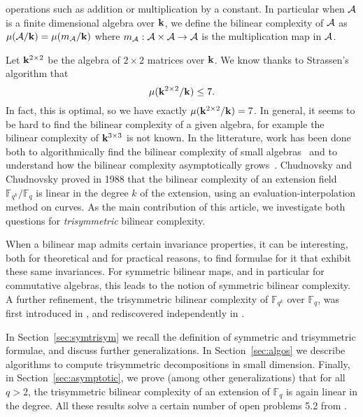 \documentclass[11pt]{article}
\begin{document}
operations such as addition or multiplication by a constant.
In particular when $\mathcal{A}$ is a finite dimensional algebra over $\mathbf{k}$,
we define the bilinear complexity of $\mathcal{A}$ as $\mu(\mathcal{A}/\mathbf{k})=\mu(m_{\mathcal{A}}/\mathbf{k})$
where $m_{\mathcal{A}}:\mathcal{A}\times\mathcal{A}\to\mathcal{A}$ is the multiplication map in $\mathcal{A}$. 

Let $\mathbf{k}^{2\times2}$ be the algebra
of $2\times2$ matrices over $\mathbf{k}$. We know thanks to Strassen's algorithm that 
\[
  \mu(\mathbf{k}^{2\times 2}/\mathbf{k}) \leq 7.
\]
In fact, this is optimal, so we have exactly $\mu(\mathbf{k}^{2\times2}/\mathbf{k})=7$. In
general, it seems to be hard to find the bilinear complexity of a given algebra,
for example the bilinear complexity of $\mathbf{k}^{3\times3}$ is not known.
In the litterature, work has been done both to algorithmically find the bilinear complexity of
small algebras~\cite{BDEZ12, Covanov19} and to understand how the bilinear
complexity asymptotically grows~\cite{CC88, BCPRRR19}. Chudnovsky and Chudnovsky
proved in 1988 that the bilinear complexity of an extension field
$\mathbb{F}_{q^k}/\mathbb{F}_{q}$ is linear in the degree $k$ of the
extension, using an evaluation-interpolation method on curves.
As the main contribution of this article, we
investigate both questions for \emph{trisymmetric} bilinear complexity.

When a bilinear map admits certain invariance properties, it can be interesting,
both for theoretical and for practical reasons,
to find formulae for it that exhibit these same invariances.
For symmetric bilinear maps, and in particular for commutative algebras, this leads to the notion of symmetric bilinear complexity.
A further refinement, the trisymmetric bilinear complexity of $\mathbb{F}_{q^k}$ over $\mathbb{F}_{q}$, was first introduced in \cite{SL84}, and rediscovered independently in \cite[App.~A]{Randriam15}.

In Section~\ref{sec:symtrisym} we recall the definition of symmetric and trisymmetric formulae, and discuss further generalizations. In Section~\ref{sec:algos} we
describe algorithms to compute trisymmetric decompositions in small dimension.
Finally, in
Section~\ref{sec:asymptotic}, we prove (among other generalizations) that for all $q>2$, the trisymmetric bilinear
complexity of an extension of $\mathbb{F}_q$ is again linear in the degree.
All these results solve a certain number of open problems 5.2 from \cite{BCPRRR19}.
\end{document}
